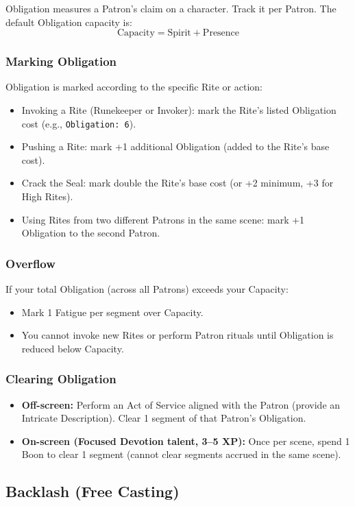 Obligation measures a Patron's claim on a character. Track it per Patron. The default Obligation capacity is:
\[
\text{Capacity} = \text{Spirit} + \text{Presence}
\]

\subsubsection{Marking Obligation}
Obligation is marked according to the specific Rite or action:
\begin{itemize}
  \item Invoking a Rite (Runekeeper or Invoker): mark the Rite's listed Obligation cost (e.g., \texttt{Obligation: 6}).
  \item Pushing a Rite: mark +1 additional Obligation (added to the Rite's base cost).
  \item Crack the Seal: mark double the Rite's base cost (or +2 minimum, +3 for High Rites).
  \item Using Rites from two different Patrons in the same scene: mark +1 Obligation to the second Patron.
\end{itemize}

\subsubsection{Overflow}
If your total Obligation (across all Patrons) exceeds your Capacity:
\begin{itemize}
  \item Mark 1 Fatigue per segment over Capacity.
  \item You cannot invoke new Rites or perform Patron rituals until Obligation is reduced below Capacity.
\end{itemize}

\subsubsection{Clearing Obligation}
\begin{itemize}
  \item \textbf{Off-screen:} Perform an Act of Service aligned with the Patron (provide an Intricate Description). Clear 1 segment of that Patron's Obligation.
  \item \textbf{On-screen (Focused Devotion talent, 3--5 XP):} Once per scene, spend 1 Boon to clear 1 segment (cannot clear segments accrued in the same scene).
\end{itemize}

\subsection{Backlash (Free Casting)}

